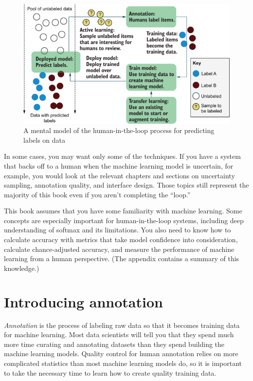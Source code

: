 \documentclass[sigconf,nonacm,screen,pbalance]{acmart}
\begin{document}
\begin{figure}[ht]
\centering
\vspace{-5pt}
\includegraphics[width=\columnwidth]{CH01_F01_Munro.png}
\vspace{-20pt}
\caption{A mental model of the human-in-the-loop process for predicting labels on data}
\vspace{-10pt}
\label{fig:f1}
\end{figure}

In some cases, you may want only some of the techniques. If you have a system that backs off to a human when the machine learning model is uncertain, for example, you would look at the relevant chapters and sections on uncertainty sampling, annotation quality, and interface design. Those topics still represent the majority of this book even if you aren't completing the ``loop.''

This book assumes that you have some familiarity with machine learning. Some concepts are especially important for human-in-the-loop systems, including deep understanding of softmax and its limitations. You also need to know how to calculate accuracy with metrics that take model confidence into consideration, calculate chance-adjusted accuracy, and measure the performance of machine learning from a human perspective. (The appendix contains a summary of this knowledge.)

\section{Introducing annotation}

\emph{Annotation} is the process of labeling raw data so that it becomes training data for machine learning. Most data scientists will tell you that they spend much more time curating and annotating datasets than they spend building the machine learning models. Quality control for human annotation relies on more complicated statistics than most machine learning models do, so it is important to take the necessary time to learn how to create quality training data.
\end{document}
